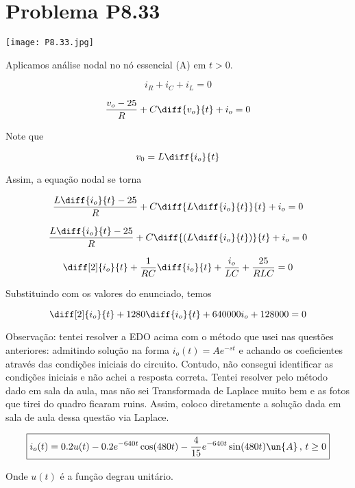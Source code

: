 
\section*{Problema P8.33}

\renewcommand*\thesection{8.33}

\begin{center}
    \texttt{[image: P8.33.jpg]}
\end{center}

Aplicamos análise nodal no nó essencial (A) em $t>0$.

\[ i_R + i_C + i_L = 0  \]

\[ \frac{v_o - 25}{R} + C\diff{v_o}{t} + i_o = 0  \]

Note que 

\[ v_0 = L\diff{i_o}{t}  \]

Assim, a equação nodal se torna 

\[ \frac{L\diff{i_o}{t} - 25}{R} + C\diff{L\diff{i_o}{t}}{t} + i_o = 0  \]

\[ \frac{L\diff{i_o}{t} - 25}{R} + C\diff{\left(L\diff{i_o}{t}\right)}{t} + i_o = 0  \]

\[ \diff[2]{i_o}{t} + \frac{1}{RC} \diff{i_o}{t} + \frac{i_o}{LC} + \frac{25}{RLC} = 0  \]

Substituindo com os valores do enunciado, temos  

\[ \diff[2]{i_o}{t} + 1280\diff{i_o}{t} + 640000i_o + 128000 = 0  \]

Observação: tentei resolver a EDO acima com o método que usei nas questões anteriores:  admitindo solução na forma
$i_o(t) = Ae^{-st}$ e achando os coeficientes através das condições iniciais do circuito.
Contudo, não consegui identificar as condições iniciais e não achei a resposta correta. Tentei resolver
pelo método dado em sala da aula, mas não sei Transformada de Laplace muito bem e as fotos que tirei do quadro ficaram ruins. 
Assim, coloco diretamente a solução dada em sala de aula dessa questão via Laplace.

\[ \boxed{i_o(t) = 0.2u(t) - 0.2e^{-640t}\cos(480t) - \frac{4}{15}e^{-640t}\sin(480t) \un{A} \, , \, t \geq 0} \]

Onde $u(t)$ é a função degrau unitário.


